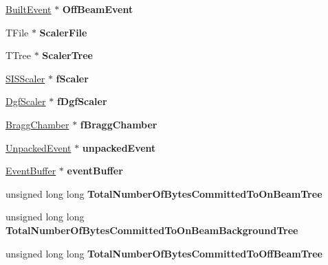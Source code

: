 \begin{DoxyCompactItemize}
\hyperlink{class_built_event}{Built\+Event} $\ast$ {\bfseries Off\+Beam\+Event}
\item 
\mbox{\label{class_event_builder_a36e61d6ae0a5ca12a187a9f93b7caa35}} 
T\+File $\ast$ {\bfseries Scaler\+File}
\item 
\mbox{\label{class_event_builder_a86f40c1de009f240484f360b4b1f00fb}} 
T\+Tree $\ast$ {\bfseries Scaler\+Tree}
\item 
\mbox{\label{class_event_builder_adf3ff93f7ca3327bc0af28de591033fd}} 
\hyperlink{class_s_i_s_scaler}{S\+I\+S\+Scaler} $\ast$ {\bfseries f\+Scaler}
\item 
\mbox{\label{class_event_builder_aff1dc4c9b45e08a24ae7c2494ebe7d21}} 
\hyperlink{class_dgf_scaler}{Dgf\+Scaler} $\ast$ {\bfseries f\+Dgf\+Scaler}
\item 
\mbox{\label{class_event_builder_af867c2663537a310fae772bce880e94e}} 
\hyperlink{class_bragg_chamber}{Bragg\+Chamber} $\ast$ {\bfseries f\+Bragg\+Chamber}
\item 
\mbox{\label{class_event_builder_a6287491909eb804907a418595242bbda}} 
\hyperlink{class_unpacked_event}{Unpacked\+Event} $\ast$ {\bfseries unpacked\+Event}
\item 
\mbox{\label{class_event_builder_aaaeb73c068c80c7722e8acd58beaa98a}} 
\hyperlink{class_event_buffer}{Event\+Buffer} $\ast$ {\bfseries event\+Buffer}
\item 
\mbox{\label{class_event_builder_aa39b1750bd0210932370aa42c2415edc}} 
unsigned long long {\bfseries Total\+Number\+Of\+Bytes\+Committed\+To\+On\+Beam\+Tree}
\item 
\mbox{\label{class_event_builder_a806f1763408486a9f46ff3a521476ca8}} 
unsigned long long {\bfseries Total\+Number\+Of\+Bytes\+Committed\+To\+On\+Beam\+Background\+Tree}
\item 
\mbox{\label{class_event_builder_a66ea0d8b3123cc4cd3458528d30f17b6}} 
unsigned long long {\bfseries Total\+Number\+Of\+Bytes\+Committed\+To\+Off\+Beam\+Tree}

\end{DoxyCompactItemize}
